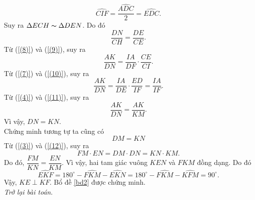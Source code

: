 \begin{bt}
{		$$\widehat{CIF}=\dfrac{\widehat{ADC}}{2}=\widehat{EDC}.$$
		Suy ra $\Delta ECH\thicksim\Delta DEN$. Do đó
		\begin{equation}\label{(9)}
		\dfrac{DN}{CH}=\dfrac{DE}{CE}.
		\end{equation}
		Từ (\ref{(8)}) và (\ref{(9)}), suy ra
		\begin{equation}\label{(10)}
		\dfrac{AK}{DN}=\dfrac{IA}{DF}\cdot\dfrac{CE}{CI}.
		\end{equation}
		Từ (\ref{(7)}) và (\ref{(10)}), suy ra
		\begin{equation}\label{(11)}
		\dfrac{AK}{DN}=\dfrac{IA}{DE}\cdot\dfrac{ED}{IF}=\dfrac{IA}{IF}.
		\end{equation}
		Từ (\ref{(4)}) và (\ref{(11)}), suy ra
		$$\dfrac{AK}{DN}=\dfrac{AK}{KM}.$$
		Vì vậy, $DN=KN$.\\
		Chứng minh tương tự ta cũng có
		\begin{equation}\label{(12)}
		DM=KN
		\end{equation}
		Từ (\ref{(3)}) và (\ref{(12)}), suy ra
		$$FM\cdot EN=DM\cdot DN=KN\cdot KM.$$
		Do đó, $\dfrac{FM}{KN}=\dfrac{EN}{KM}$. Vì vậy, hai tam giác vuông $KEN$ và $FKM$ đồng dạng. Do đó
		$$\widehat{EKF}=180^\circ-\widehat{FKM}-\widehat{EKN}=180^\circ-\widehat{FKM}-\widehat{KFM}=90^\circ.$$
		Vậy, $KE\perp KF$.
		Bổ đề \ref{bd2} được chứng minh.\\
		\textit{Trở lại bài toán}.
		\begin{center}
\end{center}}
\end{bt}
